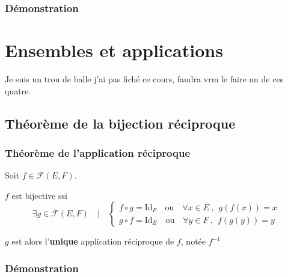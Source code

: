 \documentclass{report}
\begin{document}
      \subsubsection{Démonstration}

        \begin{tcolorbox}[colback=white, colframe=black, boxrule=0.8pt, width=1\textwidth]

        \end{tcolorbox}


    
    \newpage


  \newpage

  \section{Ensembles et applications}

    Je suis un trou de balle j'ai pas fiché ce cours, faudra vrm le faire un de ces quatre.

    \subsection{Théorème de la bijection réciproque}

        \subsubsection{Théorème de l'application réciproque}
        
          Soit $f\in\mathcal{F}(E,F)$.

          $f$ est bijective ssi \[\exists g\in\mathcal{F}(E,F) \quad | 
            \quad \begin{cases}
              f\circ g = \text{Id}_F \text{ ~ ou ~ } \forall x \in E~,~~ g(f(x)) = x\\
              g\circ f = \text{Id}_E \text{ ~ ou ~ } \forall y \in F~,~~ f(g(y)) = y
            \end{cases}\]

          $g$ est alors l'\textbf{unique} application réciproque de $f$, notée $f^{-1}$

        \subsubsection{Démonstration}
\end{document}
